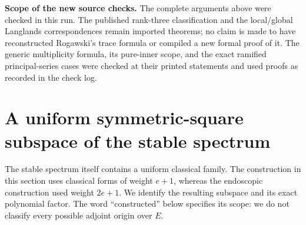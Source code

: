 \documentclass[11pt,a4paper]{article}
\theoremstyle{definition}
\renewcommand{\paragraph}[1]{\par\smallskip\noindent\textbf{#1}\quad\ignorespaces}
\begin{document}
\paragraph{Scope of the new source checks.}
The complete arguments above were checked in this run. The
published rank-three classification and the local/global
Langlands correspondences remain imported theorems; no claim
is made to have reconstructed Rogawski's trace formula or
compiled a new formal proof of it. The generic multiplicity
formula, its pure-inner scope, and the exact ramified
principal-series cases were checked at their printed
statements and used proofs as recorded in the check log.



\section{A uniform symmetric-square subspace of the stable spectrum}
\label{sec:kt-symmetric-square}

The stable spectrum itself contains a uniform classical family.  The
construction in this section uses classical forms of weight $e+1$,
whereas the endoscopic construction used weight $2e+1$.  We identify
the resulting subspace and its exact polynomial factor.  The word
``constructed'' below specifies its scope: we do not classify every
possible adjoint origin over $E$.
\end{document}
